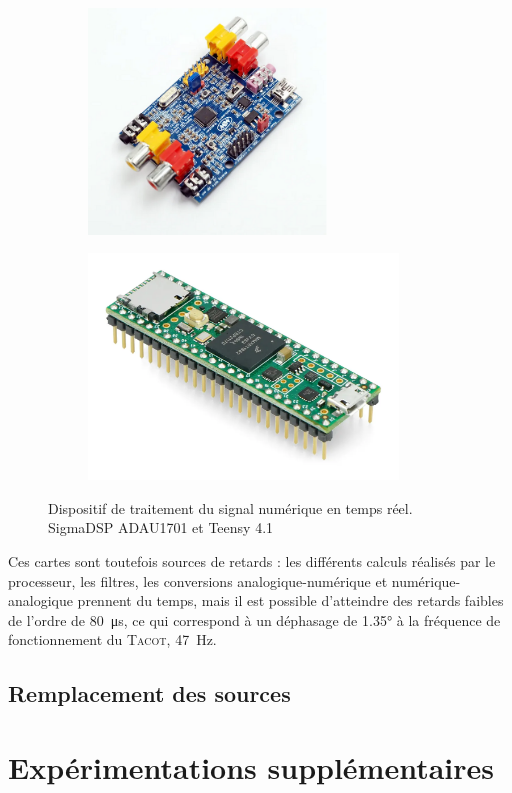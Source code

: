 \begin{figure}[!ht]
    \centering
	\begin{subfigure}{.47\textwidth}
		\centering
		\includegraphics[height=6cm]{../fig/fig_ActiveControl/ADAU1701}
		\caption{}
		\label{fig:ActiveControl_ADAU1701}
	\end{subfigure}		
	\begin{subfigure}{.47\textwidth}
		\centering
		\includegraphics[height=6cm]{../fig/fig_ActiveControl/Teensy41}
		\caption{}
		\label{fig:ActiveControl_Teensy41}
	\end{subfigure}	    
    \caption{Dispositif de traitement du signal numérique en temps réel.  SigmaDSP ADAU1701 et  Teensy 4.1}
    \label{fig:•}
\end{figure}

Ces cartes sont toutefois sources de retards : les différents calculs réalisés par le processeur, les filtres, les conversions analogique-numérique et numérique-analogique prennent du temps, mais il est possible d'atteindre des retards faibles de l'ordre de \qty{80}{\micro\second}, ce qui correspond à un déphasage de \ang{1.35} à la fréquence de fonctionnement du \textsc{Tacot}, \qty{47}{\hertz}.
\subsection{Remplacement des sources}

\section{Expérimentations supplémentaires}